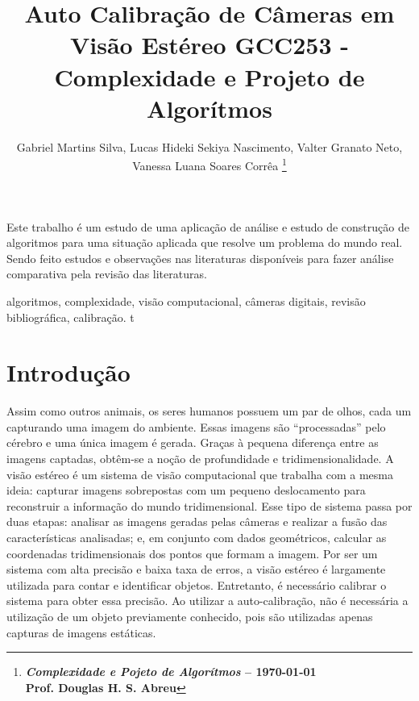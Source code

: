 \documentclass[portuguese]{sbrt}
\begin{document}
 
  
\title{Auto Calibração de Câmeras em Visão Estéreo GCC253 - Complexidade e Projeto de Algorítmos} 
  
\author{Gabriel Martins Silva, Lucas Hideki Sekiya Nascimento, Valter Granato Neto, Vanessa Luana Soares Corrêa 
\thanks{\centering \textbf{\textit{Complexidade e Pojeto de Algorítmos} -- \today \\ Prof. Douglas H. S. Abreu}}%
} 
  
\maketitle 

  
  
  
  
\begin{resumo} 
Este trabalho é um estudo de uma aplicação de análise e estudo de construção de algoritmos para uma situação aplicada que resolve um problema do mundo real. Sendo feito estudos e observações nas literaturas disponíveis para fazer análise comparativa pela revisão das literaturas.  
\end{resumo} 
\begin{chave} 
algoritmos, complexidade, visão computacional, câmeras digitais, revisão bibliográfica, calibração. t 
\end{chave} 
  

  
  

\section{Introdução} 
\label{sec:introducao} 
  
Assim como outros animais, os seres humanos possuem um par de olhos, cada um capturando uma imagem do ambiente. Essas imagens são “processadas” pelo cérebro e uma única imagem é gerada. Graças à pequena diferença entre as imagens captadas, obtêm-se a noção de profundidade e tridimensionalidade. A visão estéreo é um sistema de visão computacional que trabalha com a mesma ideia: capturar imagens sobrepostas com um pequeno deslocamento para reconstruir a informação do mundo tridimensional.
Esse tipo de sistema passa por duas etapas: analisar as imagens geradas pelas câmeras e realizar a fusão das características analisadas; e, em conjunto com dados geométricos, calcular as coordenadas tridimensionais dos pontos que formam a imagem.
Por ser um sistema com alta precisão e baixa taxa de erros, a visão estéreo é largamente utilizada para contar e identificar objetos. Entretanto, é necessário calibrar o sistema para obter essa precisão. Ao utilizar a auto-calibração, não é necessária a utilização de um objeto previamente conhecido, pois são utilizadas apenas capturas de imagens estáticas.
~\cite{cormen:2009}
\end{document}
